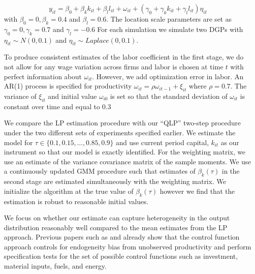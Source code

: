 \documentclass[11pt]{article}
\begin{document}
\begin{equation}
y_{it}=\beta_{0}+\beta_{k}k_{it}+\beta_{l}l_{it}+\omega_{it}+(\gamma_{0}+\gamma_{k}k_{it}+\gamma_{l}l_{it})\eta_{it}
\end{equation}
with $\beta_{0}=0, \beta_{k}=0.4$ and $\beta_{l}=0.6$. The location scale parameters are set as $\gamma_{0}=0, \gamma_{k}=0.7$ and $\gamma_{l}=-0.6$ For each simulation we simulate two DGPs with $\eta_{it}\sim N(0,0.1)$ and $\eta_{it}\sim Laplace(0,0.1)$.

To produce consistent estimates of the labor coefficient in the first stage, we do not allow for any wage variation across firms and labor is chosen at time $t$ with perfect information about $\omega_{it}$. However, we add optimization error in labor. An AR(1) process is specified for productivity $\omega_{it}=\rho\omega_{it-1}+\xi_{it}$ where $\rho=0.7$. The variance of $\xi_{it}$ and initial value $\omega_{i0}$ is set so that the standard deviation of $\omega_{it}$ is constant over time and equal to $0.3$

We compare the LP estimation procedure with our ``QLP'' two-step procedure under the two different sets of experiments specified earlier. We estimate the model for $\tau\in\{0.1, 0.15, \dots, 0.85, 0.9\}$ and use current period capital, $k_{it}$ as our instrument so that our model is exactly identified. For the weighting matrix, we use an estimate of the variance covariance matrix of the sample moments. We use a continuously updated GMM procedure such that estimates of $\beta_{k}(\tau)$ in the second stage are estimated simultaneously with the weighting matrix. We initialize the algorithm at the true value of $\beta_{k}(\tau)$ however we find that the estimation is robust to reasonable initial values.

We focus on whether our estimate can capture heterogeneity in the output distribution reasonably well compared to the mean estimates from the LP approach. Previous papers such as \cite{Olley1996} and \cite{Levinsohn2003} already show that the control function approach controls for endogeneity bias from unobserved productivity and perform specification tests for the set of possible control functions such as investment, material inputs, fuels, and energy. 
\end{document}
